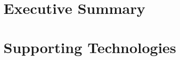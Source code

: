 \documentclass[ %
                    author={Alexander Dalton},
                supervisor={Prof. Seth Bullock},
                    degree={MEng},
                     title={Exploring Evolutionary Hardware:},
                  subtitle={Evolved Binary Arithmetic Circuits and Dynamic Problems},
                      type={research},
                      year={2018} ]{dissertation}
\begin{document}


\maketitle


\frontmatter


\makedecl


\tableofcontents
\listoffigures
\listofalgorithms



\chapter*{Executive Summary}




\chapter*{Supporting Technologies}
\end{document}
